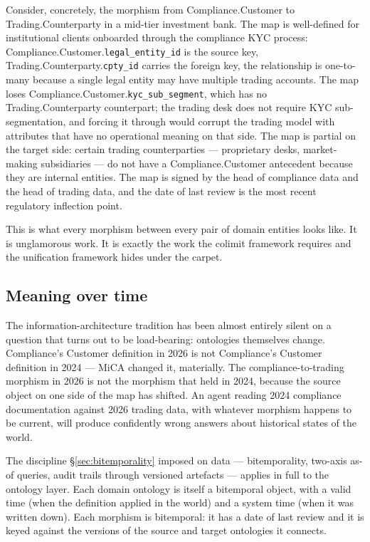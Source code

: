 \documentclass[11pt,a4paper]{article}
\begin{document}
Consider, concretely, the morphism from Compliance.Customer to Trading.Counterparty in a mid-tier investment bank. The map is well-defined for institutional clients onboarded through the compliance KYC process: Compliance.Customer.\texttt{legal\_entity\_id} is the source key, Trading.Counterparty.\texttt{cpty\_id} carries the foreign key, the relationship is one-to-many because a single legal entity may have multiple trading accounts. The map loses Compliance.Customer.\texttt{kyc\_sub\_segment}, which has no Trading.Counterparty counterpart; the trading desk does not require KYC sub-segmentation, and forcing it through would corrupt the trading model with attributes that have no operational meaning on that side. The map is partial on the target side: certain trading counterparties --- proprietary desks, market-making subsidiaries --- do not have a Compliance.Customer antecedent because they are internal entities. The map is signed by the head of compliance data and the head of trading data, and the date of last review is the most recent regulatory inflection point.

This is what every morphism between every pair of domain entities looks like. It is unglamorous work. It is exactly the work the colimit framework requires and the unification framework hides under the carpet.

\subsection{Meaning over time}

The information-architecture tradition has been almost entirely silent on a question that turns out to be load-bearing: ontologies themselves change. Compliance's Customer definition in 2026 is not Compliance's Customer definition in 2024 --- MiCA changed it, materially. The compliance-to-trading morphism in 2026 is not the morphism that held in 2024, because the source object on one side of the map has shifted. An agent reading 2024 compliance documentation against 2026 trading data, with whatever morphism happens to be current, will produce confidently wrong answers about historical states of the world.

The discipline \S\ref{sec:bitemporality} imposed on data --- bitemporality, two-axis as-of queries, audit trails through versioned artefacts --- applies in full to the ontology layer. Each domain ontology is itself a bitemporal object, with a valid time (when the definition applied in the world) and a system time (when it was written down). Each morphism is bitemporal: it has a date of last review and it is keyed against the versions of the source and target ontologies it connects.
\end{document}
